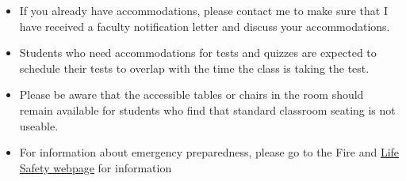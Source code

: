 \documentclass[11pt,]{article}
\begin{document}
\begin{itemize}
\item
  If you already have accommodations, please contact me to make sure
  that I have received a faculty notification letter and discuss your
  accommodations.
\item
  Students who need accommodations for tests and quizzes are expected to
  schedule their tests to overlap with the time the class is taking the
  test.
\item
  Please be aware that the accessible tables or chairs in the room
  should remain available for students who find that standard classroom
  seating is not useable.
\item
  For information about emergency preparedness, please go to the Fire
  and
  \href{https://www.pdx.edu/environmental-health-safety/fire-and-life-safety}{Life
  Safety webpage} for information
\end{itemize}
\end{document}

